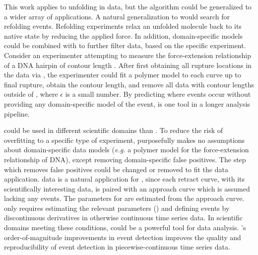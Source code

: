 This work applies \name{} to unfolding in \singlemol{} data, but the algorithm could be generalized to a wider array of applications. A natural generalization to \name{} would search for refolding events. Refolding experiments relax an unfolded molecule back to its native state by reducing the applied force. In addition, domain-specific models could be combined with \name{} to further filter data, based on the specific experiment. Consider an experimenter attempting to measure the force-extension relationship of a DNA hairpin of contour length . After first obtaining all rupture locations in the data via \name{}, the experimenter could fit a polymer model to each curve up to final rupture, obtain the contour length, and remove all data with contour lengths outside of , where $\epsilon$ is a small number. By predicting where events occur without providing any domain-specific model of the event, \name{} is one tool in a longer \singlemol{} analysis pipeline.

\name{} could be used in different scientific domains than \singlemol{}. To reduce the risk of overfitting to a specific type of \singlemol{} experiment, \name{} purposefully makes no assumptions about domain-specific data models (\textit{e.g.} a polymer model for the force-extension relationship of DNA), except removing \singlemol{} domain-specific false positives. The step which removes false positives could be changed or removed to fit the data application. \singlemol{} data is a natural application for \name{}, since each retract curve, with its scientifically interesting data, is paired with an approach curve which is assumed lacking any events. The parameters for \name{} are estimated from the approach curve. \name{} only requires estimating the relevant parameters () and defining events by discontinuous derivatives in otherwise continuous time series data. In scientific domains meeting these conditions, \name{} could be a powerful tool for data analysis.  \name{}'s order-of-magnitude improvements in event detection improves the quality and reproducibility of event detection in piecewise-continuous time series data.
